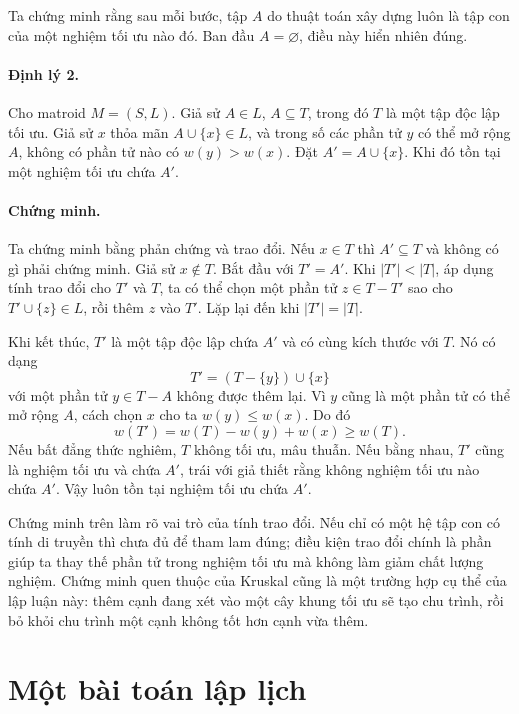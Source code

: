\documentclass[11pt]{article}
\begin{document}
Ta chứng minh rằng sau mỗi bước, tập \(A\) do thuật toán xây dựng luôn là tập
con của một nghiệm tối ưu nào đó. Ban đầu \(A=\varnothing\), điều này hiển
nhiên đúng.

\paragraph{Định lý 2.}
Cho matroid \(M=(S,L)\). Giả sử \(A\in L\), \(A\subseteq T\), trong đó \(T\) là
một tập độc lập tối ưu. Giả sử \(x\) thỏa mãn \(A\cup\{x\}\in L\), và trong số
các phần tử \(y\) có thể mở rộng \(A\), không có phần tử nào có
\(w(y)>w(x)\). Đặt \(A'=A\cup\{x\}\). Khi đó tồn tại một nghiệm tối ưu chứa
\(A'\).

\paragraph{Chứng minh.}
Ta chứng minh bằng phản chứng và trao đổi. Nếu \(x\in T\) thì \(A'\subseteq T\)
và không có gì phải chứng minh. Giả sử \(x\notin T\). Bắt đầu với
\(T'=A'\). Khi \(|T'|<|T|\), áp dụng tính trao đổi cho \(T'\) và \(T\), ta có
thể chọn một phần tử \(z\in T-T'\) sao cho \(T'\cup\{z\}\in L\), rồi thêm
\(z\) vào \(T'\). Lặp lại đến khi \(|T'|=|T|\).

Khi kết thúc, \(T'\) là một tập độc lập chứa \(A'\) và có cùng kích thước với
\(T\). Nó có dạng
\[
  T'=(T-\{y\})\cup\{x\}
\]
với một phần tử \(y\in T-A\) không được thêm lại. Vì \(y\) cũng là một phần tử
có thể mở rộng \(A\), cách chọn \(x\) cho ta \(w(y)\le w(x)\). Do đó
\[
  w(T')=w(T)-w(y)+w(x)\ge w(T).
\]
Nếu bất đẳng thức nghiêm, \(T\) không tối ưu, mâu thuẫn. Nếu bằng nhau, \(T'\)
cũng là nghiệm tối ưu và chứa \(A'\), trái với giả thiết rằng không nghiệm tối
ưu nào chứa \(A'\). Vậy luôn tồn tại nghiệm tối ưu chứa \(A'\).

Chứng minh trên làm rõ vai trò của tính trao đổi. Nếu chỉ có một hệ tập con
có tính di truyền thì chưa đủ để tham lam đúng; điều kiện trao đổi chính là
phần giúp ta thay thế phần tử trong nghiệm tối ưu mà không làm giảm chất
lượng nghiệm. Chứng minh quen thuộc của Kruskal cũng là một trường hợp cụ thể
của lập luận này: thêm cạnh đang xét vào một cây khung tối ưu sẽ tạo chu trình,
rồi bỏ khỏi chu trình một cạnh không tốt hơn cạnh vừa thêm.

\section{Một bài toán lập lịch}
\end{document}
